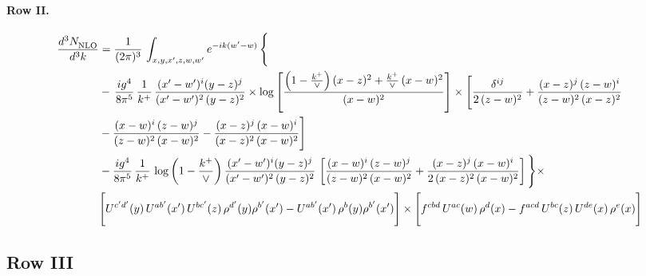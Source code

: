 \documentclass[10pt]{article}
\numberwithin{equation}{section}
\begin{document}
\paragraph{Row II.}
\begin{align}
     \frac{d^{3}N_{\rm NLO}^{\rm}}{d^{3}k}  & =   \frac{1}{(2\pi)^{3}}\, \int_{x,y,x',z,w,w^{\prime}} e^{-ik(w^{\prime}-w)}\, \Bigg\{\notag \\
& -\,\frac{ig^{4}}{8\pi^{5}}\,\frac{1}{k^{+}}\,\frac{(x'-w')^{i}(y-z)^{j}}{(x'-w')^{2}\,(y-z)^{2}}\times \log{\left[\frac{\left(1-\frac{k^{+}}{\vee}\right)(x-z)^{2}+\frac{k^{+}}{\vee}\,(x-w)^{2}}{(x-w)^{2}}\right]}\times \Bigg[\frac{\delta^{ij}}{2\,(z-w)^{2}}+\frac{(x-z)^{j}\,(z-w)^{i}}{(z-w)^{2}\,(x-z)^{2}}\notag \\ & -\frac{(x-w)^{i}\,(z-w)^{j}}{(z-w)^{2}\,(x-w)^{2}}-\frac{(x-z)^{j}\,(x-w)^{i}}{(x-z)^{2}\,(x-w)^{2}}\Bigg] \notag \\
& -\frac{ig^{4}}{8\pi^{5}}\,\frac{1}{k^{+}}\,\log{\left(1-\frac{k^{+}}{\vee}\right)}\,\frac{(x'-w')^{i}(y-z)^{j}}{(x'-w')^{2}\,(y-z)^{2}}\,\left[\frac{(x-w)^{i}\,(z-w)^{j}}{(z-w)^{2}\,(x-w)^{2}}+\frac{(x-z)^{j}\,(x-w)^{i}}{2\,(x-z)^{2}\, (x-w)^{2}}\right]\Bigg\}\times \notag \\ & \Bigg[U^{c'd'}(y)\,U^{ab'}(x')\,U^{bc'}(z)\,\rho^{d'}(y)\rho^{b'}(x')-U^{ab'}(x')\,\rho^{b}(y)\rho^{b'}(x')\Bigg]\times\Bigg[f^{cbd}\,U^{ac}(w)\,\rho^{d}(x)-f^{acd}\, U^{bc}(z)\,U^{de}(x)\,\rho^{e}(x)\Bigg] \label{eq:F:G3II}
\end{align}

\subsection{Row III}
\end{document}
